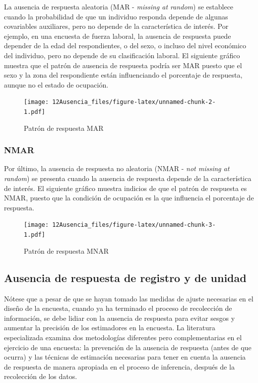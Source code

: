\documentclass[
  10pt,
  spanish,
]{book}
\begin{document}
La ausencia de respuesta aleatoria (MAR - \emph{missing at random}) se establece cuando la probabilidad de que un individuo responda depende de algunas covariables auxiliares, pero no depende de la característica de interés. Por ejemplo, en una encuesta de fuerza laboral, la ausencia de respuesta puede depender de la edad del respondientes, o del sexo, o incluso del nivel económico del individuo, pero no depende de su clasificación laboral. El siguiente gráfico muestra que el patrón de ausencia de respuesta podría ser MAR puesto que el sexo y la zona del respondiente están influenciando el porcentaje de respuesta, aunque no el estado de ocupación.

\begin{figure}
\centering
\texttt{[image: 12Ausencia\_files/figure-latex/unnamed-chunk-2-1.pdf]}
\caption{\label{fig:unnamed-chunk-2}Patrón de respuesta MAR}
\end{figure}

\hypertarget{nmar}{%
\subsubsection*{NMAR}\label{nmar}}

Por último, la ausencia de respuesta no aleatoria (NMAR - \emph{not missing at random}) se presenta cuando la ausencia de respuesta depende de la característica de interés. El siguiente gráfico muestra indicios de que el patrón de respuesta es NMAR, puesto que la condición de ocupación es la que influencia el porcentaje de respuesta.

\begin{figure}
\centering
\texttt{[image: 12Ausencia\_files/figure-latex/unnamed-chunk-3-1.pdf]}
\caption{\label{fig:unnamed-chunk-3}Patrón de respuesta MNAR}
\end{figure}

\hypertarget{ausencia-de-respuesta-de-registro-y-de-unidad}{%
\subsection{Ausencia de respuesta de registro y de unidad}\label{ausencia-de-respuesta-de-registro-y-de-unidad}}

Nótese que a pesar de que se hayan tomado las medidas de ajuste necesarias en el diseño de la encuesta, cuando ya ha terminado el proceso de recolección de información, se debe lidiar con la ausencia de respuesta para evitar sesgos y aumentar la precisión de los estimadores en la encuesta. La literatura especializada examina dos metodologías diferentes pero complementarias en el ejercicio de una encuesta: la prevención de la ausencia de respuesta (antes de que ocurra) y las técnicas de estimación necesarias para tener en cuenta la ausencia de respuesta de manera apropiada en el proceso de inferencia, después de la recolección de los datos.
\end{document}

